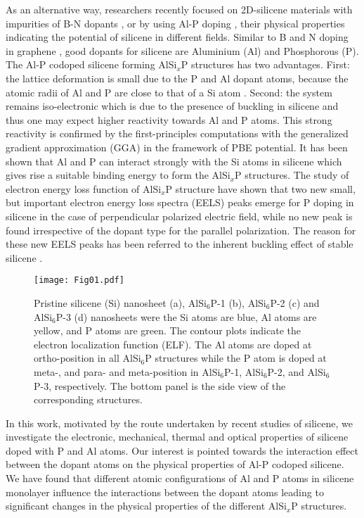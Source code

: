 \documentclass[5p,twocolumn]{elsarticle}
\begin{document}
As an alternative way, researchers recently focused on 2D-silicene materials with impurities of B-N dopants \cite{ABDULLAH2020114556}, or by using Al-P doping \cite{C4RA07976K}, their physical properties  \cite{LI2021150041, BAFEKRY2020113850, ABDULLAH2021114644} indicating the potential of silicene in different fields. 
Similar to B and N doping in graphene \cite{ABDULLAH2020126807}, good dopants for 
silicene are Aluminium (Al) and Phosphorous (P). The Al-P codoped silicene forming AlSi$_x$P structures has two advantages. First: the lattice deformation is
small due to the P and Al dopant atoms, because the atomic radii of Al
and P are close to that of a Si atom \cite{PhysRevB.87.085444}. Second: the system remains iso-electronic which is due to the presence of buckling in silicene and thus one may expect higher reactivity towards Al and P atoms. This strong reactivity is confirmed by the first-principles computations with the generalized gradient approximation (GGA) in the framework of PBE potential. It has been shown that Al and P can interact strongly with the Si atoms in silicene \cite{HERNANDEZCOCOLETZI2018242} which gives rise a suitable binding energy to form 
the AlSi$_x$P structures. The study of electron energy loss function of AlSi$_x$P structure have shown that 
two new small, but important electron energy loss spectra (EELS) peaks emerge for P doping in silicene in the case of perpendicular polarized electric field, while no new peak is found irrespective of the dopant type for the parallel polarization. The reason for these new EELS peaks has been referred to the inherent buckling effect 
of stable silicene \cite{C4RA07976K}.

 \lipsum[0]
\begin{figure*}[htb]
	\centering
	\texttt{[image: Fig01.pdf]}
	\caption{Pristine silicene (Si) nanosheet (a), AlSi$_6$P-1 (b), AlSi$_6$P-2 (c) and AlSi$_6$P-3 (d) nanosheets were the Si atoms are blue,
		Al atoms are yellow, and P atoms are green. The contour plots indicate the electron localization function (ELF). The Al atoms are doped at ortho-position in all AlSi$_6$P structures while the P atom is doped at meta-, and para- and meta-position in AlSi$_6$P-1, AlSi$_6$P-2, and AlSi$_6$P-3, respectively.  The bottom panel is the side view of the corresponding structures.}
	\label{fig01}
\end{figure*}

In this work, motivated by the route undertaken by
recent studies of silicene, we investigate
the electronic, mechanical, thermal and optical properties of silicene doped with P and Al atoms.
Our interest is pointed towards the interaction effect between the dopant atoms on the physical properties of 
Al-P codoped silicene. We have found that different atomic configurations of Al and P atoms in silicene 
monolayer influence the interactions between the dopant atoms leading to significant changes in the physical properties of the different AlSi$_x$P structures.  
\end{document}
